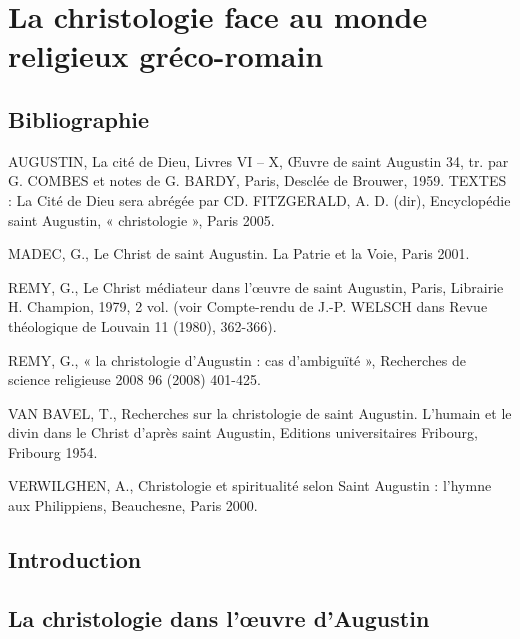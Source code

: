 \chapter{La christologie face au monde religieux gréco-romain }

\section{Bibliographie}
AUGUSTIN, La cité de Dieu, Livres VI – X, Œuvre de saint Augustin 34, tr. par G. COMBES et notes de G. BARDY, Paris, Desclée de Brouwer, 1959.
TEXTES : La Cité de Dieu sera abrégée par CD. 
FITZGERALD, A. D. (dir), Encyclopédie saint Augustin, « christologie », Paris 2005. 


MADEC, G., Le Christ de saint Augustin. La Patrie et la Voie, Paris 2001. 


REMY, G., Le Christ médiateur dans l’œuvre de saint Augustin, Paris, Librairie H. Champion, 1979, 2 vol. (voir Compte-rendu de J.-P. WELSCH dans Revue théologique de Louvain 11 (1980), 362-366). 

REMY, G., « la christologie d'Augustin : cas d'ambiguïté », Recherches de science religieuse 2008 96 (2008) 401-425.  

VAN BAVEL, T., Recherches sur la christologie de saint Augustin. L’humain et le divin dans le Christ d’après saint Augustin, Editions universitaires Fribourg, Fribourg 1954. 

VERWILGHEN, A., Christologie et spiritualité selon Saint Augustin : l'hymne aux Philippiens, Beauchesne, Paris 2000.


\section{Introduction}


\section{La christologie dans l’œuvre d’Augustin }


